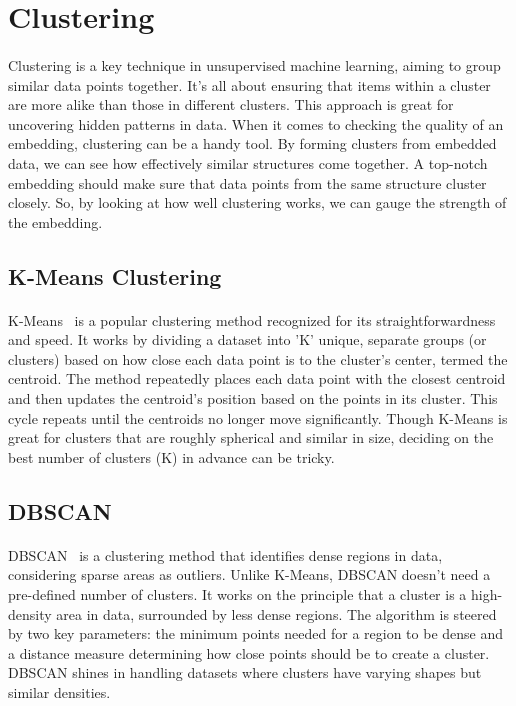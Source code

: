 \section{Clustering}
    \paragraph{}Clustering is a key technique in unsupervised machine learning, aiming to group similar data points together. It's all about ensuring that items within a cluster are more alike than those in different clusters. This approach is great for uncovering hidden patterns in data. When it comes to checking the quality of an embedding, clustering can be a handy tool. By forming clusters from embedded data, we can see how effectively similar structures come together. A top-notch embedding should make sure that data points from the same structure cluster closely. So, by looking at how well clustering works, we can gauge the strength of the embedding.

    \subsection{K-Means Clustering}
        \paragraph*{}K-Means~\cite{macqueen_methods_1967} is a popular clustering method recognized for its straightforwardness and speed. It works by dividing a dataset into 'K' unique, separate groups (or clusters) based on how close each data point is to the cluster's center, termed the centroid. The method repeatedly places each data point with the closest centroid and then updates the centroid's position based on the points in its cluster. This cycle repeats until the centroids no longer move significantly. Though K-Means is great for clusters that are roughly spherical and similar in size, deciding on the best number of clusters (K) in advance can be tricky.

    \subsection{DBSCAN}
        \paragraph*{}DBSCAN~\cite{ester_density-based_1996} is a clustering method that identifies dense regions in data, considering sparse areas as outliers. Unlike K-Means, DBSCAN doesn't need a pre-defined number of clusters. It works on the principle that a cluster is a high-density area in data, surrounded by less dense regions. The algorithm is steered by two key parameters: the minimum points needed for a region to be dense and a distance measure determining how close points should be to create a cluster. DBSCAN shines in handling datasets where clusters have varying shapes but similar densities.
